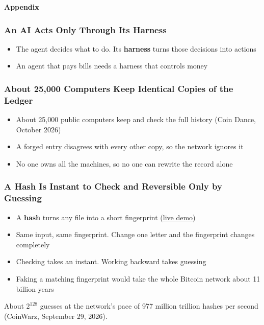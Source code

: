 \documentclass[aspectratio=169]{beamer}
\newcommand{\bi}{\begin{itemize}}
\newcommand{\ei}{\end{itemize}}
\newcommand{\m}{\item}
\begin{document}
\begin{frame}
\vfill
\begin{center}
{\Huge\textcolor{gtnavy}{\textbf{Appendix}}}
\end{center}
\vfill
\end{frame}


\begin{frame}[label=appx-harness]
\frametitle{An AI Acts Only Through Its Harness}

\bi
\m The agent decides what to do. Its \textbf{harness} turns those decisions into actions
\m An agent that pays bills needs a harness that controls money
\ei
\par\vspace{0pt plus 1fill}\hfill{\scriptsize \hyperlink{main-rule}{}}
\end{frame}


\begin{frame}[label=appx-copies]
\frametitle{About 25,000 Computers Keep Identical Copies of the Ledger}

\bi
\m About 25,000 public computers keep and check the full history (Coin Dance, October 2026)
\m A forged entry disagrees with every other copy, so the network ignores it
\m No one owns all the machines, so no one can rewrite the record alone
\ei
\par\vspace{0pt plus 1fill}\hfill{\scriptsize \hyperlink{main-bitcoin}{}}
\end{frame}


\begin{frame}[label=appx-hash]
\frametitle{A Hash Is Instant to Check and Reversible Only by Guessing}

\bi
\m A \textbf{hash} turns any file into a short fingerprint (\href{https://emn178.github.io/online-tools/sha256.html}{live demo})
\m Same input, same fingerprint. Change one letter and the fingerprint changes completely
\m Checking takes an instant. Working backward takes guessing
\m Faking a matching fingerprint would take the whole Bitcoin network about 11 billion years
\ei
\vfill
{\scriptsize About $2^{128}$ guesses at the network's pace of 977 million trillion hashes per second (CoinWarz, September 29, 2026).}
\par\vspace{0pt plus 1fill}\hfill{\scriptsize \hyperlink{main-verse}{}}
\end{frame}
\end{document}
